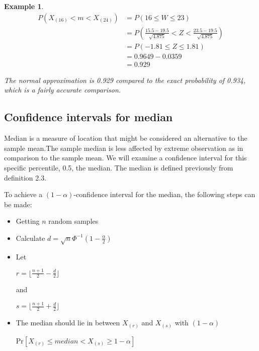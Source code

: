 \documentclass[11pt,a4paper]{article}
\theoremstyle{plain}
\newtheorem{exmp}[fact]{Example}
\begin{document}
\begin{exmp}
\[
\begin{array}{ll}
P(X_{(16)}<m<X_{(24)})&=P(16 \le W \le 23)\\
&=P\left(\frac{15.5-19.5}{\sqrt{4.875}} < Z < \frac{23.5-19.5}{\sqrt{4.875}} \right) \\
&=P(-1.81 \le Z \le 1.81)\\
&=0.9649-0.0359\\
&=0.929
\end{array}
\]

The normal approximation is 0.929 compared to the exact probability of 0.934, which is a fairly accurate comparison. 

\end{exmp}

\subsection*{Confidence intervals for median}
Median is  a measure of location that might be considered an alternative to the sample mean.The sample median is less affected by extreme observation as in comparison to the sample mean. We will examine a confidence interval for this specific percentile, 0.5, the median. The median is defined previously from definition 2.3.

To achieve a $(1-\alpha)$-confidence interval for the median, the following steps can be made:
\begin{itemize}
  \item Getting $n$ random samples
  \item Calculate $d=\sqrt{n}\Phi^{-1}(1-\frac{\alpha}{2})$
  \item Let
  \begin{center}
  $r=\lfloor\frac{n+1}{2}-\frac{d}{2}\rfloor$
  \end{center}
  and
  \begin{center}
  $s=\lfloor\frac{n+1}{2}+\frac{d}{2}\rfloor$
  \end{center}
  \item The median should lie in between $X_{(r)}$ and $X_{(s)}$ with $(1-\alpha)$
  \begin{center}
  Pr$[X_{(r)}\leq median < X_{(s)} \geq 1-\alpha]$
  \end{center}
\end{itemize}
\end{document}

